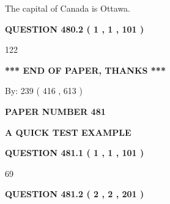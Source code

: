 \documentclass[12pt]{article}
\begin{document}
 
The capital of Canada is Ottawa.
 
 
 
 
  
\vspace{0.2in}
  
{\textbf{\Large{QUESTION
480.2 
 ( 1 , 1 , 101 )
}}}
  
  
 
 
\noindent{}

122
 
 
   
   
 \vspace{0.2in}
 
   
   
   
   
\vspace{1.0in} 
{\textbf{\large{ *** END OF PAPER, THANKS *** }}} 
   
   
\hspace{1.0in} By: 
 239 ( 416 ,  613 )
   
   
   
   
\newpage 
\setcounter{page}{ 
   481001 } 
   
   
   
   
 {\textbf{ \Large{ PAPER NUMBER  481  }}}
   
   
\vspace{0.2in}
   
   
   
   
   
   
 \vspace{0.2in}
{\LARGE {\textbf{ A QUICK TEST EXAMPLE}}}
   
   
  
\vspace{0.2in}
  
{\textbf{\Large{QUESTION
481.1 
 ( 1 , 1 , 101 )
}}}
  
  
 
 
\noindent{}

69
 
 
  
\vspace{0.2in}
  
{\textbf{\Large{QUESTION
481.2 
 ( 2 , 2 , 201 )
}}}
  
\end{document}
